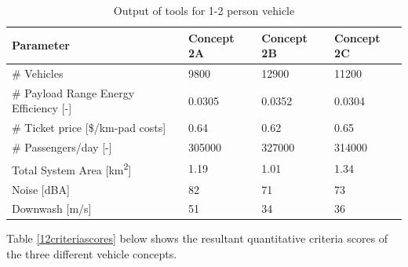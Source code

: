 \begin{table}[H]
\centering
\captionsetup{justification=centering}
\caption{Output of tools for 1-2 person vehicle}
\label{12output}
\begin{tabular}{@{}llll@{}}
\toprule
\textbf{Parameter}                                          & \textbf{Concept 2A} & \textbf{Concept 2B} & \textbf{Concept 2C} \\ \midrule
\# Vehicles                                                 &     9800       &      12900      &    11200        \\
\# Payload Range Energy Efficiency  {[}-{]}                         &      0.0305      &  0.0352          &  0.0304          \\
\# Ticket price {[}\$/km-pad costs{]}                        &     0.64       &  0.62          &     0.65       \\
\# Passengers/day {[}-{]}                                   &     305000       &    327000       &   314000         \\
Total System Area {[}km\textsuperscript{2}{]}                  &    1.19        &    1.01        &    1.34        \\
Noise {[}dBA{]}                                             &     82       &       71     &      73      \\ 
Downwash {[}m/s{]}                                          & 51            & 34            & 36        \\ \bottomrule
\end{tabular}
\end{table}

Table \ref{12criteriascores} below shows the resultant quantitative criteria scores of the three different vehicle concepts.

